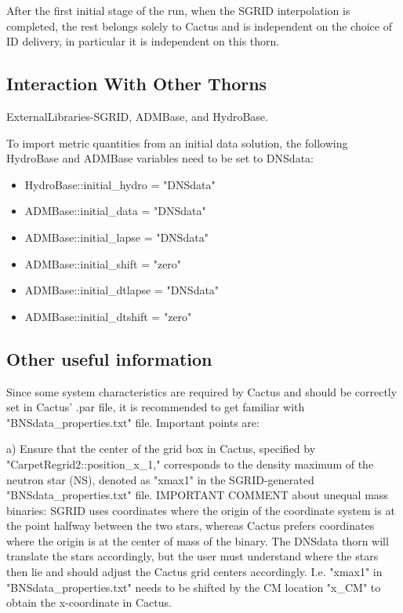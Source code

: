 After the first initial stage of the run, when the SGRID interpolation is
completed, the rest belongs solely to Cactus and is independent on the
choice of ID delivery, in particular it is independent on this thorn.


\subsection{Interaction With Other Thorns}

ExternalLibraries-SGRID, ADMBase, and HydroBase.

To import metric quantities from an initial data solution, the following HydroBase and ADMBase variables need to be set to DNSdata:
\begin{itemize}
\item HydroBase::initial\_hydro          = "DNSdata"
\item ADMBase::initial\_data             = "DNSdata"
\item ADMBase::initial\_lapse            = "DNSdata"
\item ADMBase::initial\_shift            = "zero"
\item ADMBase::initial\_dtlapse          = "DNSdata"
\item ADMBase::initial\_dtshift          = "zero"
\end{itemize}

\subsection{Other useful information}

Since some system characteristics are required by Cactus and should be
correctly set in Cactus' .par file, it is recommended to get familiar with
"BNSdata\_properties.txt" file. Important points are:

a) Ensure that the center of the grid box in Cactus, specified by
"CarpetRegrid2::position\_x\_1," corresponds to the density maximum of the
neutron star (NS), denoted as "xmax1" in the SGRID-generated
"BNSdata\_properties.txt" file. IMPORTANT COMMENT about unequal mass
binaries: SGRID uses coordinates where the origin of the coordinate system
is at the point halfway between the two stars, whereas Cactus prefers
coordinates where the origin is at the center of mass of the binary. The
DNSdata thorn will translate the stars accordingly, but the user must
understand where the stars then lie and should adjust the Cactus grid
centers accordingly. I.e. "xmax1" in "BNSdata\_properties.txt" needs to be
shifted by the CM location "x\_CM" to obtain the x-coordinate in Cactus.

